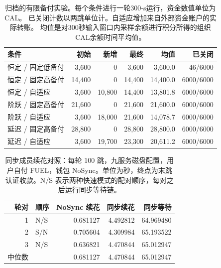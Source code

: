 \begin{table}[!ht]
\centering\small
\caption{归档的有限备付实验。每个条件进行一轮300-s运行，资金数值单位为CAL。
已关闭计数以两跳单位计。自适应增加来自外部资金账户的实际转账。
均值是对300秒输入窗口内采样余额进行积分所得的组织CAL余额时间平均值。}
\label{tab:supp-reserve}
\begin{tabular}{@{}lrrrrr@{}}
\toprule
条件 & 初始 & 新增 & 最终 & 均值 & 已关闭 \\
\midrule
恒定 / 固定低备付 & 3,600 & 0 & 3,600 & 3,600.0 & 46/6000 \\
恒定 / 固定高备付 & 14,400 & 0 & 14,400 & 14,400.0 & 6000/6000 \\
恒定 / 自适应 & 3,600 & 10,800 & 14,400 & 13,801.8 & 6000/6000 \\
阶跃 / 固定高备付 & 21,600 & 0 & 21,600 & 21,600.0 & 6000/6000 \\
阶跃 / 自适应 & 3,600 & 18,000 & 21,600 & 14,078.7 & 6000/6000 \\
延迟 / 固定高备付 & 28,800 & 0 & 28,800 & 28,800.0 & 6000/6000 \\
延迟 / 自适应 & 3,600 & 19,700 & 23,300 & 20,611.2 & 6000/6000 \\
\bottomrule
\end{tabular}
\end{table}


\begin{table}[!ht]
\centering\small
\caption{同步成员续花对照：每轮 100 跳，九服务磁盘配置，用户自付 FUEL，钱包 NoSync。单位为秒，终点为末跳认证收款。N/S 表示两种快速模式的配对顺序，每对之后运行同步等待链。}
\label{tab:supp-sync-chain}
\begin{tabular}{@{}rlrrr@{}}
\toprule
轮对 & 顺序 & NoSync 续花 & 同步续花 & 同步等待 \\
\midrule
1 & N/S & 0.681127 & 4.492812 & 64.969480 \\
2 & S/N & 0.705604 & 4.309984 & 65.193522 \\
3 & N/S & 0.636821 & 4.470844 & 65.012947 \\
\midrule
中位数 & & 0.681127 & 4.470844 & 65.012947 \\
\bottomrule
\end{tabular}
\end{table}
